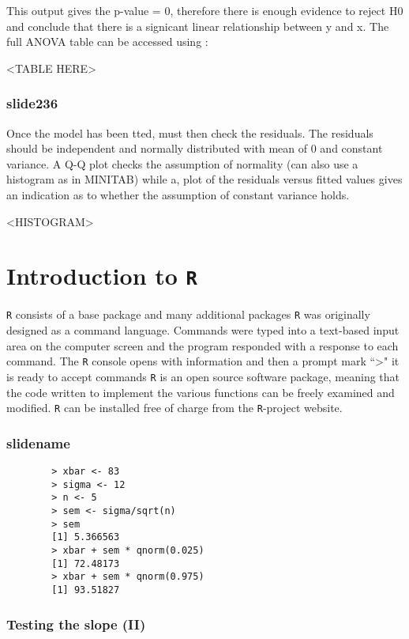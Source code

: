 \documentclass[a4paper,12pt]{article}
\begin{document}
\begin{itemize}
\begin{itemize}
		This output gives the p-value = 0, therefore there is enough evidence to reject H0 and conclude that there is a signicant linear relationship between y and x. The full ANOVA table can be accessed using :
		
		<TABLE HERE>
		
		
		
		\subsubsection{slide236}
		Once the model has been tted, must then check the residuals.
		The residuals should be independent and normally distributed with
		mean of 0 and constant variance.
		A Q-Q plot checks the assumption of normality (can also use a
		histogram as in MINITAB) while a, plot of the residuals versus fitted values gives an indication as to whether the assumption of constant variance holds.
		
		<HISTOGRAM>
		
		
		
		
		\section{Introduction to \texttt{R}}
		\texttt{R} consists of a base package and many additional packages
		\texttt{R} was originally designed as a command language.  
		Commands were typed into a text-based input area on the computer screen and the program responded with a response to each command.
		The \texttt{R} console opens with information and then a prompt mark  ``>"  it is ready to accept commands
		\texttt{R}  is an open source software package, meaning that the code written to implement the various functions can be freely examined and modified.
		\texttt{R} can be installed free of charge from the \texttt{R}-project website.
		
		\subsubsection{slidename}
		
		\large \begin{verbatim}
		> xbar <- 83
		> sigma <- 12
		> n <- 5
		> sem <- sigma/sqrt(n)
		> sem
		[1] 5.366563
		> xbar + sem * qnorm(0.025)
		[1] 72.48173
		> xbar + sem * qnorm(0.975)
		[1] 93.51827
		\end{verbatim}\large
		
		
		\subsubsection{Testing the slope (II)}
		

\end{itemize}
\end{itemize}
\end{document}
